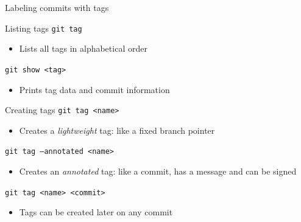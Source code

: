 \documentclass{beamer}
\begin{document}
\begin{frame}{Labeling commits with tags}
  \begin{block}{Listing tags}
    \texttt{git tag}
    \begin{itemize}
    \item Lists all tags in alphabetical order
    \end{itemize}
    \texttt{git show <tag>}
    \begin{itemize}
    \item Prints tag data and commit information
    \end{itemize}
  \end{block}
  \begin{block}{Creating tags}
    \texttt{git tag <name>}
    \begin{itemize}
    \item Creates a \emph{lightweight} tag: like a fixed branch pointer
    \end{itemize}
    \texttt{git tag --annotated <name>}
    \begin{itemize}
    \item Creates an \emph{annotated} tag: like a commit, has a message and can be signed
    \end{itemize}
    \texttt{git tag <name> <commit>}
    \begin{itemize}
    \item Tags can be created later on any commit
    \end{itemize}
  \end{block}
\end{frame}
\end{document}
